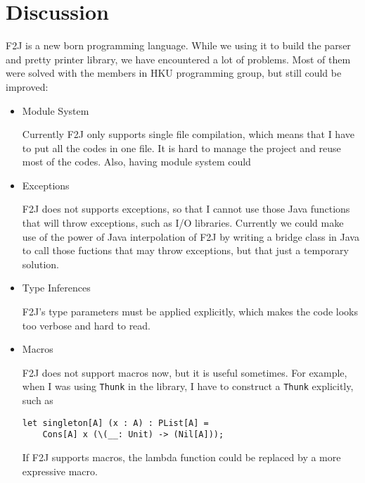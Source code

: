 \chapter{Discussion}

F2J is a new born programming language. While we using it to build the parser and pretty printer library, we have encountered a lot of problems. Most of them were solved with the members in HKU programming group, but still could be improved:

\begin{itemize}
\item Module System

Currently F2J only supports single file compilation, which means that I have to put all the codes in one file. It is hard to manage the project and reuse most of the codes. Also, having module system could

\item Exceptions

F2J does not supports exceptions, so that I cannot use those Java functions that will throw exceptions, such as I/O libraries. Currently we could make use of the power of Java interpolation of F2J by writing a bridge class in Java to call those fuctions that may throw exceptions, but that just a temporary solution.

\item Type Inferences

F2J's type parameters must be applied explicitly, which makes the code looks too verbose and hard to read.

\item Macros

F2J does not support macros now, but it is useful sometimes. For example, when I was using \texttt{Thunk} in the library, I have to construct a \texttt{Thunk} explicitly, such as

\begin{lstlisting}
let singleton[A] (x : A) : PList[A] =
    Cons[A] x (\(__: Unit) -> (Nil[A]));
\end{lstlisting}

If F2J supports macros, the lambda function could be replaced by a more expressive macro.

\end{itemize}
